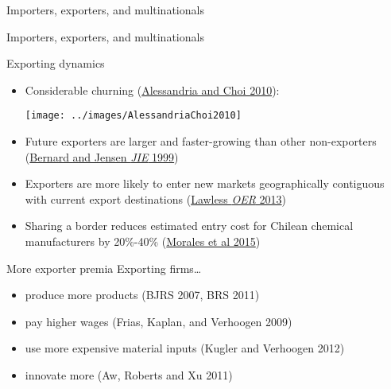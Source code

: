 \documentclass[10pt,notes=hide]{beamer}
\begin{document}
\begin{frame}{Importers, exporters, and multinationals}
\end{frame}
\begin{frame}{Importers, exporters, and multinationals}
\end{frame}
\begin{frame}{Exporting dynamics}
\begin{itemize}
  \item Considerable churning (\href{http://www.philadelphiafed.org/research-and-data/publications/business-review/2010/q4/brq410_understanding-exports-from-the-plant-up.pdf}{Alessandria and Choi 2010}): 
  \begin{center}\texttt{[image: ../images/AlessandriaChoi2010]}\end{center}
  \item Future exporters are larger and faster-growing than other non-exporters (\href{http://www.sciencedirect.com.proxy.uchicago.edu/science/article/pii/S0022199698000270}{Bernard and Jensen \emph{JIE} 1999})
  \item Exporters are more likely to enter new markets geographically contiguous with current export destinations (\href{http://www.martinalawless.com/Papers/marginaldistance.pdf}{Lawless \emph{OER} 2013})
  \item Sharing a border reduces estimated entry cost for Chilean chemical manufacturers by 20\%-40\% (\href{https://sites.google.com/site/edumoralescasado/files/ExtendedGravity.pdf?attredirects=0}{Morales et al 2015})
\end{itemize}
\end{frame}
\begin{frame}{More exporter premia}
Exporting firms\dots
\begin{itemize}
\item produce more products (BJRS 2007, BRS 2011)
\item pay higher wages (Frias, Kaplan, and Verhoogen 2009)
\item use more expensive material inputs (Kugler and Verhoogen 2012)
\item innovate more (Aw, Roberts and Xu 2011)
\end{itemize}
\end{frame}
\end{document}
